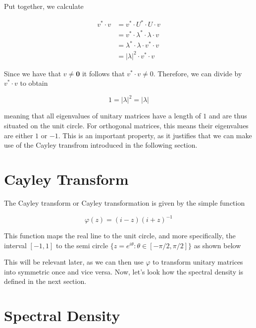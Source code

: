 Put together, we calculate

\begin{align*}
    v^* \cdot v & = v^* \cdot U^* \cdot U \cdot v \\
    & = v^* \cdot \lambda^* \cdot \lambda \cdot v \\
    & = \lambda^* \cdot \lambda\cdot v^* \cdot v \\
    & = \left| \lambda \right|^2 \cdot v^* \cdot v
\end{align*}

Since we have that $v \neq \mathbf{0}$ it follows that $v^* \cdot v \neq 0$.
Therefore, we can divide by $v^* \cdot v$ to obtain

\begin{equation} \label{eq:unitary_eigenvalues}
    1 = \left| \lambda \right|^2 = \left| \lambda \right|
\end{equation}

meaning that all eigenvalues of unitary matrices have a length of $1$ and are thus situated on the unit circle.
For orthogonal matrices, this means their eigenvalues are either $1$ or $-1$.
This is an important property, as it justifies that we can make use of the Cayley transfrom introduced in the following section.

\section{Cayley Transform}

The Cayley transform or Cayley transformation is given by the simple function

$$\varphi(z) = (i-z)(i+z)^{-1}$$

This function maps the real line to the unit circle, and more specifically, the interval $[-1, 1]$ to the semi circle
$\{z = e^{i\theta}: \theta \in [-\pi/2,\pi/2]\}$ as shown below

\vspace{0.5cm}



This will be relevant later, as we can then use $\varphi$ to transform unitary matrices into symmetric once and vice versa.
Now, let's look how the spectral density is defined in the next section.

\section{Spectral Density}

